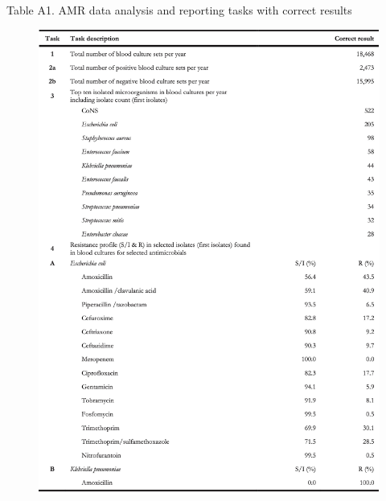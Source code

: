 \documentclass[
]{book}
\begin{document}
Table A1. AMR data analysis and reporting tasks with correct results

\begin{figure}

{\centering \includegraphics[width=1\linewidth]{images/06-ta01} 

}

\end{figure}
\end{document}
